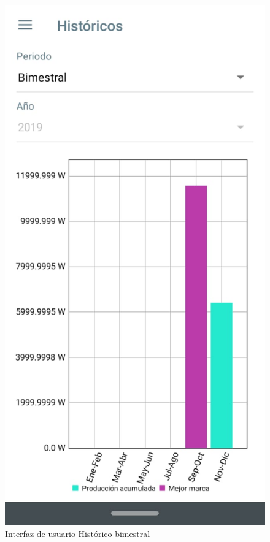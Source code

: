 \begin{figure}[H]
	\centering
	\includegraphics[scale=0.4]{Capitulo4/software/submodulos/images/man29.png}
	\caption{Interfaz de usuario Histórico bimestral}
	\label{fig:Historico bimestral}
\end{figure}


